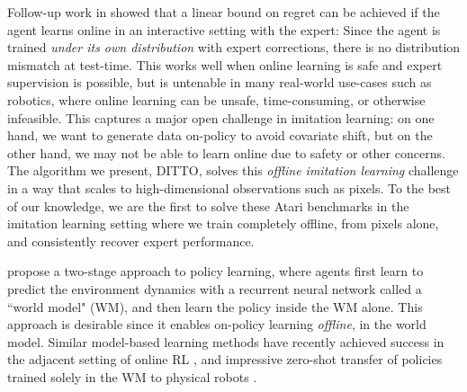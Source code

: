 \documentclass[10pt]{article} %
\theoremstyle{plain}
\theoremstyle{definition}
\theoremstyle{remark}
\begin{document}
Follow-up work in \cite{Bagnell2} showed that a linear bound on regret can be achieved if the agent learns online in an interactive setting with the expert: Since the agent is trained \textit{under its own distribution} with expert corrections, there is no distribution mismatch at test-time. This works well when online learning is safe and expert supervision is possible, but is untenable in many real-world use-cases such as robotics, where online learning can be unsafe, time-consuming, or otherwise infeasible. This captures a major open challenge in imitation learning: on one hand, we want to generate data on-policy to avoid covariate shift, but on the other hand, we may not be able to learn online due to safety or other concerns. The algorithm we present, DITTO, solves this \emph{offline imitation learning} challenge in a way that scales to high-dimensional observations such as pixels. To the best of our knowledge, we are the first to solve these Atari benchmarks in the imitation learning setting where we train completely offline, from pixels alone, and consistently recover expert performance. 

\cite{worldmodels} propose a two-stage approach to policy learning, where agents first learn to predict the environment dynamics with a recurrent neural network called a ``world model" (WM), and then learn the policy inside the WM alone. This approach is desirable since it enables on-policy learning \emph{offline}, in the world model. Similar model-based learning methods have recently achieved success in the adjacent setting of online RL \citep{dreamerv2}, and impressive zero-shot transfer of policies trained solely in the WM to physical robots \citep{DayDreamer}. 
\end{document}

